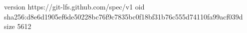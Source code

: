 version https://git-lfs.github.com/spec/v1
oid sha256:d8e6d1905ef6de50228bc76f9c7835bc0f18bf31b76c555d74110fa99acf039d
size 5612
